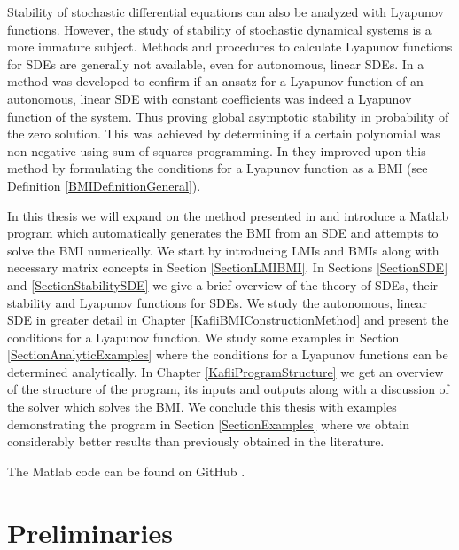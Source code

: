 \documentclass[a4paper,12pt,twoside,BCOR=10mm]{scrbook}
\begin{document}
Stability of stochastic differential equations can also be analyzed with Lyapunov functions. However, the study of stability of stochastic dynamical systems is a more immature subject. Methods and procedures to calculate Lyapunov functions for SDEs are generally not available, even for autonomous, linear SDEs. In \citep{HGGS2018localLya} a method was developed to confirm if an ansatz for a Lyapunov function of an autonomous, linear SDE with constant coefficients was indeed a Lyapunov function of the system. Thus proving global asymptotic stability in probability of the zero solution. This was achieved by determining if a certain polynomial was non-negative using sum-of-squares programming. In \citep{Ha2019BMI} they improved upon this method by formulating the conditions for a Lyapunov function as a BMI (see Definition \ref{BMIDefinitionGeneral}).

In this thesis we will expand on the method presented in \citep{Ha2019BMI} and introduce a Matlab program which automatically generates the BMI from an SDE and attempts to solve the BMI numerically. We start by introducing LMIs and BMIs along with necessary matrix concepts in Section \ref{SectionLMIBMI}. In Sections \ref{SectionSDE} and \ref{SectionStabilitySDE} we give a brief overview of the theory of SDEs, their stability and Lyapunov functions for SDEs. We study the autonomous, linear SDE in greater detail in Chapter \ref{KafliBMIConstructionMethod} and present the conditions for a Lyapunov function. We study some examples in Section \ref{SectionAnalyticExamples} where the conditions for a Lyapunov functions can be determined analytically. In Chapter \ref{KafliProgramStructure} we get an overview of the structure of the program, its inputs and outputs along with a discussion of the solver which solves the BMI. We conclude this thesis with examples demonstrating the program in Section \ref{SectionExamples} where we obtain considerably better results than previously obtained in the literature.

The Matlab code can be found on GitHub \citep{Mverk2022}.

\chapter{Preliminaries}
\end{document}

